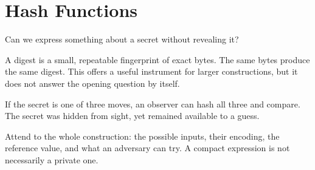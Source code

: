 \chapter{Hash Functions}
\label{short:hash-functions}

Can we express something about a secret without revealing it?

A digest is a small, repeatable fingerprint of exact bytes. The same bytes
produce the same digest. This offers a useful instrument for larger
constructions, but it does not answer the opening question by itself.

If the secret is one of three moves, an observer can hash all three and
compare. The secret was hidden from sight, yet remained available to a
guess.

Attend to the whole construction: the possible inputs, their encoding, the
reference value, and what an adversary can try. A compact expression is not
necessarily a private one.

